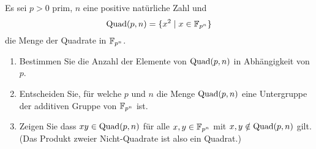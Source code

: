 \begin{question}[subtitle = Quadrate in endlichen Körpern]
  Es sei $p > 0$ prim, $n$ eine positive natürliche Zahl und
  \[
    \operatorname{Quad}(p,n) = \{x^2 \mid x \in \mathbb{F}_{p^n}\}
  \]
  die Menge der Quadrate in $\mathbb{F}_{p^n}$.
  \begin{enumerate}
    \item
      Bestimmen Sie die Anzahl der Elemente von $\operatorname{Quad}(p,n)$ in Abhängigkeit von $p$.
    \item
      Entscheiden Sie, für welche $p$ und $n$ die Menge $\operatorname{Quad}(p,n)$ eine Untergruppe der additiven Gruppe von $\mathbb{F}_{p^n}$ ist.
    \item
      Zeigen Sie dass $xy \in \operatorname{Quad}(p,n)$ für alle $x, y \in \mathbb{F}_{p^n}$ mit $x, y \notin \operatorname{Quad}(p,n)$ gilt.
      (Das Produkt zweier Nicht-Quadrate ist also ein Quadrat.)
  \end{enumerate}
\end{question}


